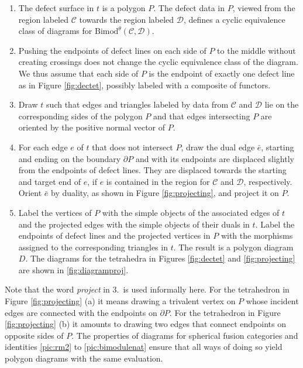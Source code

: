 \documentclass[1.5pt, a4paper]{article}
\newcommand{\mac}{\mathcal C}
\newcommand{\mad}{\mathcal D}
\newcommand{\Bimod}{\mathrm{Bimod}}
\begin{document}
\begin{enumerate}
\item The  defect surface in $t$ is a polygon $P$.  The defect data in $P$, viewed from the region labeled  $\mac$ towards the region labeled $\mad$, defines a cyclic equivalence class of  diagrams for $\Bimod^\theta(\mac,\mad)$. 

\item Pushing the endpoints of defect lines on each side of $P$ to the middle without creating crossings does not change the cyclic equivalence class of the diagram. We thus assume that each side of $P$ is the endpoint of exactly one defect line as  in Figure \ref{fig:dectet}, possibly labeled with  a composite of functors.  

\item Draw  $t$  such that  edges and triangles labeled by data from $\mac$ and $\mad$ lie on the corresponding sides of the polygon $P$ and that edges intersecting $P$ are oriented by the positive normal vector of $P$. 

\item For each edge $e$ of $t$ that does not intersect $P$, draw the dual edge $\bar e$, starting and ending
 on the boundary  $\partial P$ and with its endpoints are displaced slightly from the endpoints of defect lines. They are displaced  towards the starting and target end of $e$, if $e$ is contained in the region for $\mac$ and $\mad$, respectively.
Orient $\bar e$ by duality, as shown in Figure \ref{fig:projecting}, and project it on $P$.

\item Label the vertices of $P$ with the simple objects of the associated edges of $t$ and the projected edges  with the simple objects 
 of their duals in $t$. Label the endpoints of defect lines and the projected vertices in $P$ with the morphisms assigned to the corresponding triangles in $t$. The result is a polygon diagram $D$.  The diagrams for the tetrahedra in Figures \ref{fig:dectet} and \ref{fig:projecting} are  shown in \eqref{fig:diagramproj}.
\end{enumerate}





Note that the word \emph{project} in 3.~is used informally here. For the tetrahedron in Figure \ref{fig:projecting} (a) it means  drawing a trivalent vertex on $P$  whose incident edges are connected with the endpoints on $\partial P$. For the tetrahedron in Figure \ref{fig:projecting} (b) it amounts to drawing two edges that connect  endpoints on opposite sides of $P$. The properties of diagrams for spherical fusion categories and identities \eqref{pic:rm2} to \eqref{pic:bimodulenat} ensure that all ways of doing so yield polygon diagrams with the same evaluation.  
\end{document}
